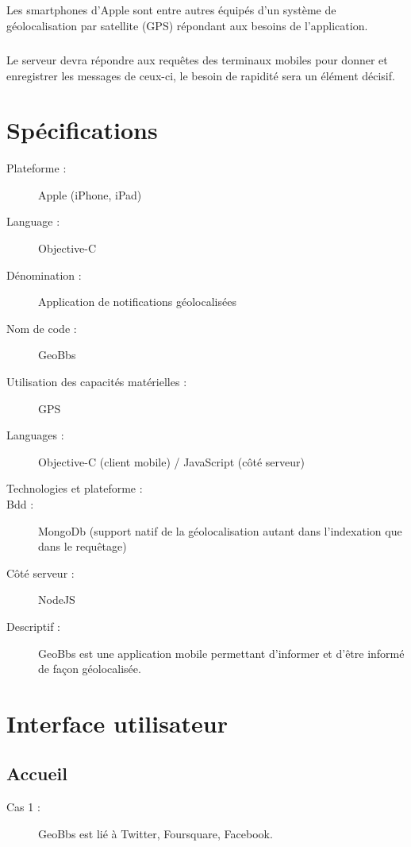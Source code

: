 \documentclass[a4paper,12pt]{report}
\begin{document}
\begin{onehalfspace}
	\paragraph*{}
	Les smartphones d'Apple sont entre autres équipés d'un système de géolocalisation par satellite (GPS) répondant aux besoins de l'application.

	\paragraph*{}
	Le serveur devra répondre aux requêtes des terminaux mobiles pour donner et enregistrer les messages de ceux-ci, le besoin de rapidité sera un élément décisif.
	
	\chapter*{Spécifications}

	\begin{description}
	\item[Plateforme :] Apple (iPhone, iPad)
	\item[Language :] Objective-C
	\item[Dénomination :] Application de notifications géolocalisées
	\item[Nom de code :] GeoBbs
	\item[Utilisation des capacités matérielles :] GPS
	\item[Languages :] Objective-C (client mobile) / JavaScript (côté serveur)
	\item[Technologies et plateforme :]
	\item[Bdd :] MongoDb (support natif de la géolocalisation autant dans l’indexation que dans le requêtage)
	\item[Côté serveur :] NodeJS
	\item[Descriptif :] GeoBbs est une application mobile permettant d’informer et d’être informé de façon géolocalisée.
	\end{description}

	\newpage

	\chapter*{Interface utilisateur}
	\section*{Accueil}
	\begin{description}
		\item[Cas 1 :] GeoBbs est lié à Twitter, Foursquare, Facebook.


\end{description}
\end{onehalfspace}
\end{document}
